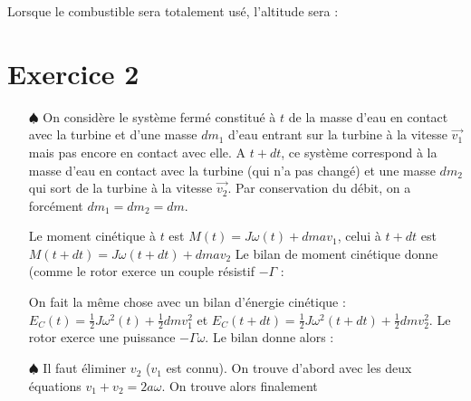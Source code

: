 \documentclass{report}
\begin{document}
\begin{itemize}
	Lorsque le combustible sera totalement usé, l'altitude sera :

	\noindent{}
	
\end{itemize}

\section*{Exercice 2}

\begin{itemize}

	\item[$\spadesuit$] On considère le système fermé constitué à $t$ de la masse d'eau en contact avec la turbine et d'une masse $dm_1$ d'eau entrant sur la turbine à la vitesse $\vec{v_1}$ mais pas encore en contact avec elle. A $t+dt$, ce système correspond à la masse d'eau en contact avec la turbine (qui n'a pas changé) et une masse $dm_2$ qui sort de la turbine à la vitesse $\vec{v_2}$. Par conservation du débit, on a forcément $dm_1=dm_2=dm$.
	
	Le moment cinétique à $t$ est $M(t)=J\omega(t) +dmav_1$, celui à $t+dt$ est $M(t+dt)=J\omega(t+dt) +dmav_2$
	Le bilan de moment cinétique donne (comme le rotor exerce un couple résistif $-\Gamma$ :
	
	\noindent{}
	
On fait la même chose avec un bilan d'énergie cinétique : $E_C(t)=\frac{1}{2}J\omega^2(t)+\frac{1}{2}dmv_1^2$ et $E_C(t+dt)=\frac{1}{2}J\omega^2(t+dt)+\frac{1}{2}dmv_2^2$. Le rotor exerce une puissance $-\Gamma\omega$. Le bilan donne alors :

	\noindent{}
	
	\item[$\spadesuit$] Il faut éliminer $v_2$ ($v_1$ est connu). On trouve d'abord avec les deux équations $v_1+v_2=2a\omega$. On trouve alors finalement 
	

\end{itemize}
\end{document}
